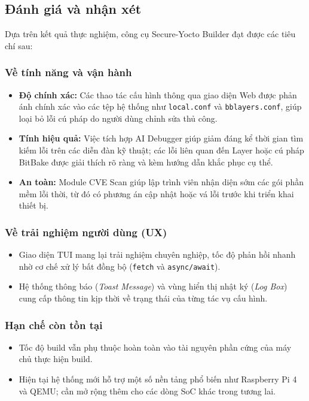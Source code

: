 \subsection{Đánh giá và nhận xét}

Dựa trên kết quả thực nghiệm, công cụ Secure-Yocto Builder đạt được các tiêu chí sau:

\subsubsection{Về tính năng và vận hành}

\begin{itemize}
    \item \textbf{Độ chính xác:} Các thao tác cấu hình thông qua giao diện Web được phản ánh chính xác vào các tệp hệ thống như \texttt{local.conf} và \texttt{bblayers.conf}, giúp loại bỏ lỗi cú pháp do người dùng chỉnh sửa thủ công.
    \item \textbf{Tính hiệu quả:} Việc tích hợp AI Debugger giúp giảm đáng kể thời gian tìm kiếm lỗi trên các diễn đàn kỹ thuật; các lỗi liên quan đến Layer hoặc cú pháp BitBake được giải thích rõ ràng và kèm hướng dẫn khắc phục cụ thể.
    \item \textbf{An toàn:} Module CVE Scan giúp lập trình viên nhận diện sớm các gói phần mềm lỗi thời, từ đó có phương án cập nhật hoặc vá lỗi trước khi triển khai thiết bị.
\end{itemize}

\subsubsection{Về trải nghiệm người dùng (UX)}

\begin{itemize}
    \item Giao diện TUI mang lại trải nghiệm chuyên nghiệp, tốc độ phản hồi nhanh nhờ cơ chế xử lý bất đồng bộ (\texttt{fetch} và \texttt{async/await}).
    \item Hệ thống thông báo (\textit{Toast Message}) và vùng hiển thị nhật ký (\textit{Log Box}) cung cấp thông tin kịp thời về trạng thái của từng tác vụ cấu hình.
\end{itemize}

\subsubsection{Hạn chế còn tồn tại}

\begin{itemize}
    \item Tốc độ build vẫn phụ thuộc hoàn toàn vào tài nguyên phần cứng của máy chủ thực hiện build.
    \item Hiện tại hệ thống mới hỗ trợ một số nền tảng phổ biến như Raspberry Pi 4 và QEMU; cần mở rộng thêm cho các dòng SoC khác trong tương lai.
\end{itemize}


